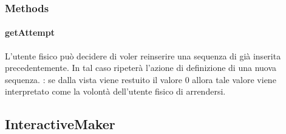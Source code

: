 \documentclass[letterpaper,10pt,italian,openany,oneside]{sphinxmanual}
\begin{document}
\subsubsection{Methods}
\label{\detokenize{test/it/unicam/cs/pa/mastermind/players/InteractiveBreaker:methods}}

\paragraph{getAttempt}
\label{\detokenize{test/it/unicam/cs/pa/mastermind/players/InteractiveBreaker:getattempt}}

\begin{fulllineitems}
\label{\detokenize{test/it/unicam/cs/pa/mastermind/players/InteractiveBreaker:it.unicam.cs.pa.mastermind.players.InteractiveBreaker.getAttempt()}}
L’utente fisico può decidere di voler reinserire una sequenza di  già inserita precedentemente. In tal caso ripeterà l’azione di definizione di una nuova sequenza. : se dalla vista  viene restuito il valore 0 allora tale valore viene interpretato come la volontà dell’utente fisico di arrendersi.

\end{fulllineitems}



\subsection{InteractiveMaker}
\label{\detokenize{test/it/unicam/cs/pa/mastermind/players/InteractiveMaker:interactivemaker}}\label{\detokenize{test/it/unicam/cs/pa/mastermind/players/InteractiveMaker::doc}}
\end{document}
